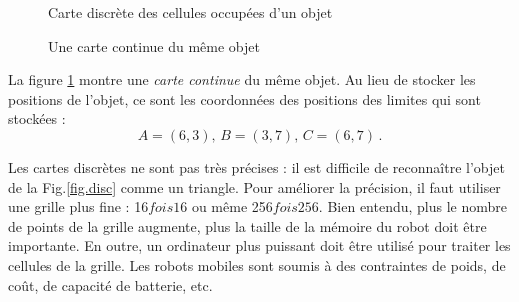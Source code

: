 \begin{figure}
\begin{minipage}{.45\textwidth}
\caption{Carte discrète des cellules occupées d'un objet}\label{fig.disc}
\end{minipage}
\hspace{\fill}
\begin{minipage}{.45\textwidth}
\caption{Une carte continue du même objet}
\label{fig.cont}
\end{minipage}
\end{figure}

La figure \ref{fig.cont} montre une \emph{carte continue} du même objet. Au lieu de stocker les positions de l'objet, ce sont les coordonnées des positions des limites qui sont stockées :
\[
A = (6,3),\, B = (3,7),\, C = (6,7)\,.
\]

Les cartes discrètes ne sont pas très précises : il est difficile de reconnaître l'objet de la Fig.\ref{fig.disc} comme un triangle. Pour améliorer la précision, il faut utiliser une grille plus fine : 16$ fois 16$ ou même 256$ fois 256$. Bien entendu, plus le nombre de points de la grille augmente, plus la taille de la mémoire du robot doit être importante. En outre, un ordinateur plus puissant doit être utilisé pour traiter les cellules de la grille. Les robots mobiles sont soumis à des contraintes de poids, de coût, de capacité de batterie, etc. 

